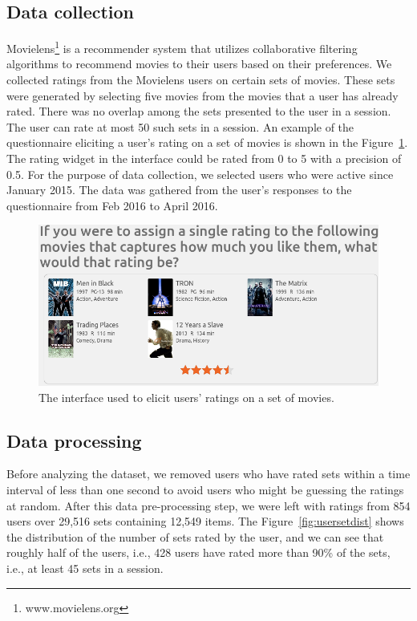 

\subsection{Data collection}
Movielens\footnote{www.movielens.org} is a recommender system that utilizes collaborative filtering
algorithms to recommend movies to their users based
on their preferences.
We collected ratings from the Movielens users on certain sets of movies. These
sets were generated by selecting five movies from the movies that a user has
already rated. There was no overlap among the sets presented to the user in a
session. The user can rate at most 50 such sets in a session. An example of
the questionnaire eliciting a user's rating on a set of movies is shown in the
Figure~\ref{fig:mlset}. The rating widget in the interface could be rated from 0 to 5 with a
precision of 0.5. For the purpose of data collection, we selected users who were active since January 2015. The data was gathered from the user's responses to
the questionnaire from Feb 2016 to April 2016.


\begin{figure}[ht]
  \includegraphics[scale=0.30]{figures/mlset.png}
  \caption{The interface used to elicit users' ratings on a set of movies.}
  \label{fig:mlset}
\end{figure}

\subsection {Data processing}
Before analyzing the dataset, we removed users who have rated sets within a
time interval of less than one second to avoid users who might be guessing
the ratings at random. After this data pre-processing step, we were left with ratings
from 854 users over 29,516  sets containing 12,549 items. The Figure~\ref{fig:usersetdist} shows the distribution of the number of sets rated by the user,
and we can see that roughly half of the users, i.e., 428 users have rated more
than 90\% of the sets, i.e., at least 45 sets in a session.


